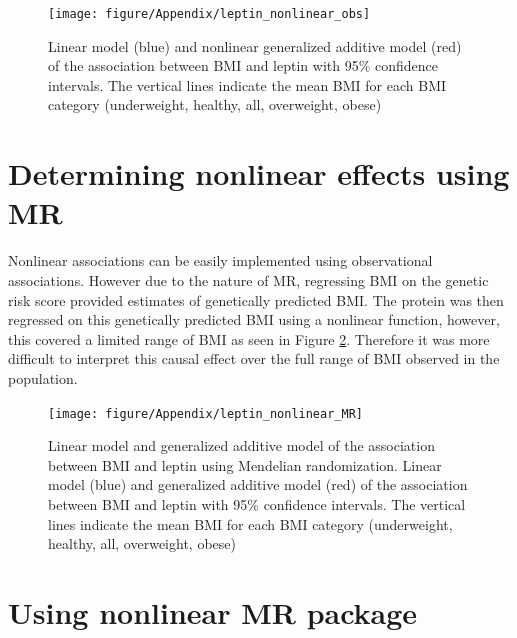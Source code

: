\documentclass[11pt,twoside]{bristolthesis}
\begin{document}
\begin{figure}
\texttt{[image: figure/Appendix/leptin\_nonlinear\_obs]} \caption[Linear model and generalized additive model of the association between BMI and leptin]{Linear model (blue) and nonlinear generalized additive model (red) of the association between BMI and leptin with 95\% confidence intervals. The vertical lines indicate the mean BMI for each BMI category (underweight, healthy, all, overweight, obese)}\label{fig:leptin-lm-GAM}
\end{figure}
\hypertarget{determining-nonlinear-effects-using-mr}{%
\section{Determining nonlinear effects using MR}\label{determining-nonlinear-effects-using-mr}}

Nonlinear associations can be easily implemented using observational associations. However due to the nature of MR, regressing BMI on the genetic risk score provided estimates of genetically predicted BMI. The protein was then regressed on this genetically predicted BMI using a nonlinear function, however, this covered a limited range of BMI as seen in Figure \ref{fig:leptin-lm-GAM-MR}. Therefore it was more difficult to interpret this causal effect over the full range of BMI observed in the population.



\begin{figure}
\texttt{[image: figure/Appendix/leptin\_nonlinear\_MR]} \caption[Linear model and generalized additive model of the association between BMI and leptin using Mendelian randomization]{Linear model and generalized additive model of the association between BMI and leptin using Mendelian randomization. Linear model (blue) and generalized additive model (red) of the association between BMI and leptin with 95\% confidence intervals. The vertical lines indicate the mean BMI for each BMI category (underweight, healthy, all, overweight, obese)}\label{fig:leptin-lm-GAM-MR}
\end{figure}
\hypertarget{using-nonlinear-mr-package}{%
\section{Using nonlinear MR package}\label{using-nonlinear-mr-package}}
\end{document}
